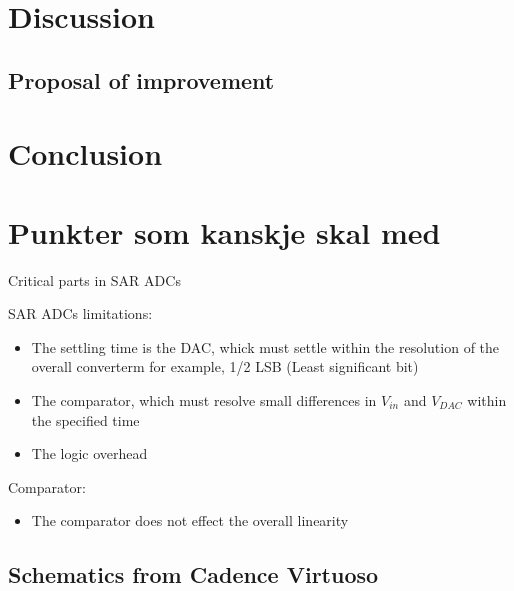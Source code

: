 \documentclass[english, 12pt, a4paper]{ifimaster}
\begin{document}
\chapter{Discussion}
\section{Proposal of improvement}
\chapter{Conclusion}


\chapter{Punkter som kanskje skal med}
Critical parts in SAR ADCs 


SAR ADCs limitations:

\begin{itemize}
 \item The settling time is the DAC, whick must settle within the resolution of the overall converterm for example, 1/2 LSB (Least significant bit)
 \item The comparator, which must resolve small differences in $V_{in}$ and $V_{DAC}$ within the specified time
 \item The logic overhead

 \end{itemize}
Comparator:

\begin{itemize}
 \item The comparator does not effect the overall linearity 
\end{itemize}


\begin{appendices}
\chapter{Schematics from Cadence Virtuoso}
\end{appendices}

\printbibliography{}
\end{document}
